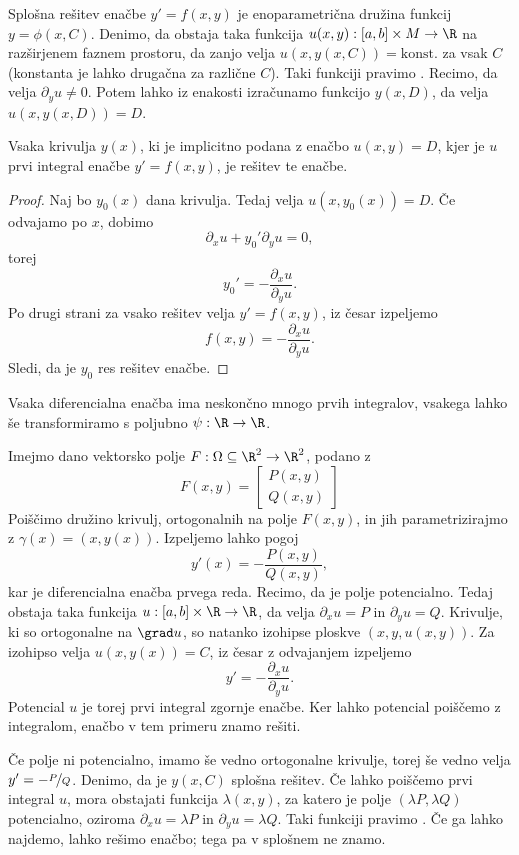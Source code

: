 
Splošna rešitev enačbe $y' = f(x, y)$ je enoparametrična družina funkcij $y =
\phi(x, C)$.
Denimo, da obstaja taka funkcija $u(x, y) : [a, b] \times M \to \R$ na
razširjenem faznem prostoru, da zanjo velja $u(x, y(x, C)) = \text{konst.}$ za
vsak $C$ (konstanta je lahko drugačna za različne $C$).
Taki funkciji pravimo .
Recimo, da velja $\partial_y u \ne 0$.
Potem lahko iz enakosti izračunamo funkcijo $y(x, D)$, da velja $u(x, y(x, D)) =
D$.

\begin{trditev}
  Vsaka krivulja $y(x)$, ki je implicitno podana z enačbo $u(x, y) = D$, kjer je
  $u$ prvi integral enačbe $y' = f(x, y)$, je rešitev te enačbe.
\end{trditev}

\begin{proof}
  Naj bo $y_0(x)$ dana krivulja.
  Tedaj velja $u(x, y_0(x)) = D$.
  Če odvajamo po $x$, dobimo
  \[
	\partial_x u + y_0' \partial_y u = 0,
  \]
  torej
  \[
	y_0' = - \frac{\partial_x u}{\partial_y u}.
  \]
  Po drugi strani za vsako rešitev velja $y' = f(x, y)$,
  iz česar izpeljemo
  \[
	f(x, y) = -\frac{\partial_x u}{\partial_y u}.
  \]
  Sledi, da je $y_0$ res rešitev enačbe.
\end{proof}

Vsaka diferencialna enačba ima neskončno mnogo prvih integralov, vsakega lahko
še transformiramo s poljubno $\psi: \R \to \R$.


Imejmo dano vektorsko polje $F: \Omega \subseteq \R^2 \to \R^2$, podano z
\[
  F(x, y) =
  \begin{bmatrix}
	P(x, y) \\ Q(x, y)
  \end{bmatrix}
\]
Poiščimo družino krivulj, ortogonalnih na polje $F(x, y)$, in jih
parametrizirajmo z $\gamma(x) = (x, y(x))$.
Izpeljemo lahko pogoj
\[
  y'(x) = - \frac{P(x, y)}{Q(x, y)},
\]
kar je diferencialna enačba prvega reda.
Recimo, da je polje potencialno.
Tedaj obstaja taka funkcija $u: [a, b] \times \R \to \R$, da velja $\partial_x u
= P$ in $\partial_y u = Q$.
Krivulje, ki so ortogonalne na $\grad u$, so natanko izohipse ploskve $(x, y,
u(x, y))$. Za izohipso velja $u(x, y(x)) = C$, iz česar z odvajanjem izpeljemo
\[
  y' = - \frac{\partial_x u}{\partial_y u}.
\]
Potencial $u$ je torej prvi integral zgornje enačbe.
Ker lahko potencial poiščemo z integralom, enačbo v tem primeru znamo rešiti.

Če polje ni potencialno, imamo še vedno ortogonalne krivulje, torej še vedno
velja $y' = -\nicefrac{P}{Q}$.
Denimo, da je $y(x, C)$ splošna rešitev.
Če lahko poiščemo prvi integral $u$, mora obstajati funkcija $\lambda(x, y)$, za
katero je polje $(\lambda P, \lambda Q)$ potencialno, oziroma $\partial_x u =
\lambda P$ in $\partial_y u = \lambda Q$.
Taki funkciji pravimo .
Če ga lahko najdemo, lahko rešimo enačbo; tega pa v splošnem ne znamo.


